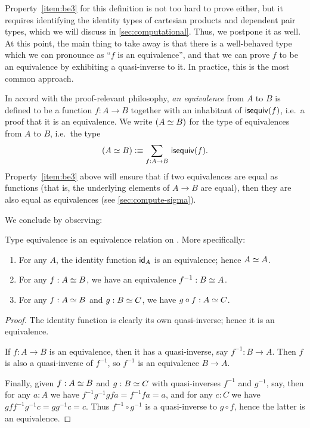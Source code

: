 Property~\ref{item:be3} for this definition is not too hard to prove either, but it requires identifying the identity types of cartesian products and dependent pair types, which we will discuss in \autoref{sec:computational}.
Thus, we postpone it as well.
At this point, the main thing to take away is that there is a well-behaved type which we can pronounce as ``$f$ is an equivalence'', and that we can prove $f$ to be an equivalence by exhibiting a quasi-inverse to it.
In practice, this is the most common approach.

In accord with the proof-relevant philosophy, \emph{an equivalence} from $A$ to $B$ is defined to be a function $f:A\to B$ together with an inhabitant of $\isequiv (f)$, i.e.\ a proof that it is an equivalence.
We write $(\eqv A B)$ for the type of equivalences from $A$ to $B$, i.e.\ the type
\begin{equation}\label{eq:eqv}
  (\eqv A B) \defeq \sm{f:A\to B} \isequiv(f).
\end{equation}
Property~\ref{item:be3} above will ensure that if two equivalences are equal as functions (that is, the underlying elements of $A\to B$ are equal), then they are also equal as equivalences (see \autoref{sec:compute-sigma}).

We conclude by observing:

\begin{lem}\label{thm:equiv-eqrel}
  Type equivalence is an equivalence relation on \type.
  More specifically:
  \begin{enumerate}
  \item For any $A$, the identity function $\idfunc[A]$ is an equivalence; hence $\eqv A A$.
  \item For any $f:\eqv A B$, we have an equivalence $f^{-1} : \eqv B A$.
  \item For any $f:\eqv A B$ and $g:\eqv B C$, we have $g\circ f : \eqv A C$.
  \end{enumerate}
\end{lem}
\begin{proof}
  The identity function is clearly its own quasi-inverse; hence it is an equivalence.

  If $f:A\to B$ is an equivalence, then it has a quasi-inverse, say $f^{-1}:B\to A$.
  Then $f$ is also a quasi-inverse of $f^{-1}$, so $f^{-1}$ is an equivalence $B\to A$.

  Finally, given $f:\eqv A B$ and $g:\eqv B C$ with quasi-inverses $f^{-1}$ and $g^{-1}$, say, then for any $a:A$ we have $f^{-1} g^{-1} g f a = f^{-1} f a = a$, and for any $c:C$ we have $g f f^{-1} g^{-1} c = g g^{-1} c = c$.
  Thus $f^{-1} \circ g^{-1}$ is a quasi-inverse to $g\circ f$, hence the latter is an equivalence.
\end{proof}



